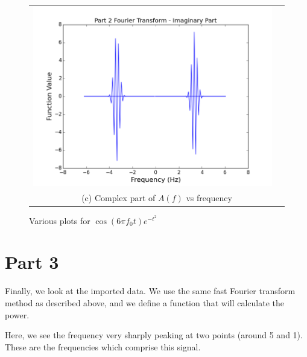 \documentclass[11pt]{article}
\begin{document}
\begin{figure}[ht]
\begin{tabular}{cc}
\includegraphics[scale=.4]{prt2_fourComp.png}\\
\multicolumn{2}{c}{(c) Complex part of $A(f)$ vs frequency} \\[6pt]
\end{tabular}
\caption{Various plots for $\cos (6\pi f_0 t) e^{-t^2} $}
\end{figure}

\section{Part 3}

Finally, we look at the imported data. We use the same fast Fourier transform method as described above, and we define a function that will calculate the power. 

Here, we see the frequency very sharply peaking at two points (around 5 and 1). These are the frequencies which comprise this signal. 
\end{document}
